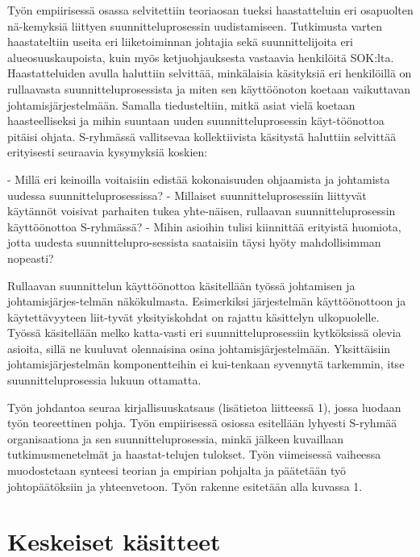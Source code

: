 \documentclass[12pt,a4paper,oneside,pdftex]{report}
\begin{document}
Työn empiirisessä osassa selvitettiin teoriaosan tueksi haastatteluin eri osapuolten nä-kemyksiä liittyen suunnitteluprosessin uudistamiseen. Tutkimusta varten haastateltiin useita eri liiketoiminnan johtajia sekä suunnittelijoita eri alueosuuskaupoista, kuin myös ketjuohjauksesta vastaavia henkilöitä SOK:lta. Haastatteluiden avulla haluttiin selvittää, minkälaisia käsityksiä eri henkilöillä on rullaavasta suunnitteluprosessista ja miten sen käyttöönoton koetaan vaikuttavan johtamisjärjestelmään. Samalla tiedusteltiin, mitkä asiat vielä koetaan haasteelliseksi ja mihin suuntaan uuden suunnitteluprosessin käyt-töönottoa pitäisi ohjata. S-ryhmässä vallitsevaa kollektiivista käsitystä haluttiin selvittää erityisesti seuraavia kysymyksiä koskien:

-   Millä eri keinoilla voitaisiin edistää kokonaisuuden ohjaamista ja johtamista uudessa suunnitteluprosessissa?
-	Millaiset suunnitteluprosessiin liittyvät käytännöt voisivat parhaiten tukea yhte-näisen, rullaavan suunnitteluprosessin käyttöönottoa S-ryhmässä?
-	Mihin asioihin tulisi kiinnittää erityistä huomiota, jotta uudesta suunnittelupro-sessista saataisiin täysi hyöty mahdollisimman nopeasti?

Rullaavan suunnittelun käyttöönottoa käsitellään työssä johtamisen ja johtamisjärjes-telmän näkökulmasta. Esimerkiksi järjestelmän käyttöönottoon ja käytettävyyteen liit-tyvät yksityiskohdat on rajattu käsittelyn ulkopuolelle. Työssä käsitellään melko katta-vasti eri suunnitteluprosessiin kytköksissä olevia asioita, sillä ne kuuluvat olennaisina osina johtamisjärjestelmään. Yksittäisiin johtamisjärjestelmän komponentteihin ei kui-tenkaan syvennytä tarkemmin, itse suunnitteluprosessia lukuun ottamatta.

Työn johdantoa seuraa kirjallisuuskatsaus (lisätietoa liitteessä 1), jossa luodaan työn teoreettinen pohja. Työn empiirisessä osiossa esitellään lyhyesti S-ryhmää organisaationa ja sen suunnitteluprosessia, minkä jälkeen kuvaillaan tutkimusmenetelmät ja haastat-telujen tulokset. Työn viimeisessä vaiheessa muodostetaan synteesi teorian ja empirian pohjalta ja päätetään työ johtopäätöksiin ja yhteenvetoon. Työn rakenne esitetään alla kuvassa 1.


% 

\chapter{Keskeiset käsitteet}
\label{chapter:background}
\end{document}

